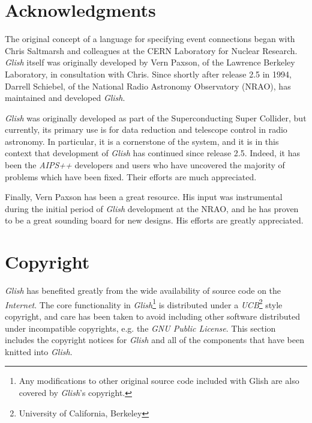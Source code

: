 
\chapter{Acknowledgments}
\label{ack}

The original concept of a language for specifying event connections began
with Chris Saltmarsh and colleagues at the CERN Laboratory for Nuclear
Research.  {\em Glish} itself was originally developed by Vern Paxson, of the
Lawrence Berkeley Laboratory, in consultation with Chris.  Since shortly after
release 2.5 in 1994, Darrell Schiebel, of the National Radio Astronomy
Observatory (NRAO), has maintained and developed {\em Glish}.

{\em Glish} was originally developed as part of the Superconducting Super
Collider, but currently, its primary use is for data reduction and telescope
control in radio astronomy. In particular, it is a cornerstone of
the  system, and it is in this context
that development of {\em Glish} has continued since release 2.5.  Indeed,
it has been the {\em AIPS++} developers and users who have uncovered
the majority of problems which have been fixed. Their efforts are much
appreciated.

Finally, Vern Paxson has been a great resource. His input
was instrumental during the initial period of {\em Glish} development
at the NRAO, and he has proven to be a great sounding board
for new designs. His efforts are greatly appreciated.

\chapter{Copyright}
\label{copyright}

{\em Glish} has benefited greatly from the wide availability of source code on the
{\em Internet}. The core functionality in {\em Glish}\footnote{Any
modifications to other original source code included with Glish are also covered by
{\em Glish}'s copyright.} is distributed under
a {\em UCB}\footnote{University of California, Berkeley} style copyright, and care
has been taken to avoid including other software distributed under incompatible
copyrights, e.g. the {\em GNU Public License}. This section includes the
copyright notices for {\em Glish} and all of the components that have been
knitted into {\em Glish}.

